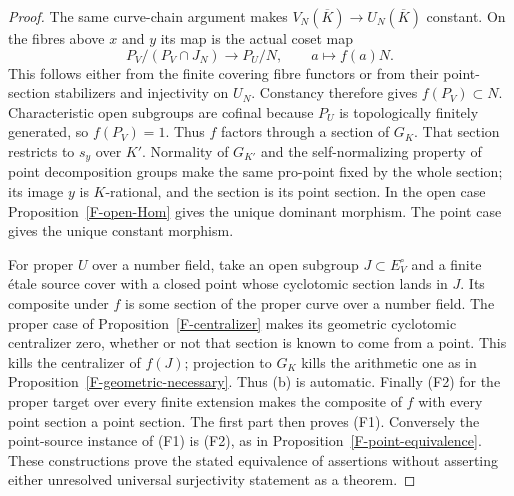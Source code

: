 \documentclass[11pt,oneside]{article}
\begin{document}
\begin{proof}
The same curve-chain argument makes
$V_N(\overline K)\to U_N(\overline K)$ constant. On the
fibres above $x$ and $y$ its map is the actual coset map
\[
 P_V/(P_V\cap J_N)\longrightarrow P_U/N,
 \qquad a\longmapsto f(a)N.
\]
This follows either from the finite covering fibre functors or
from their point-section stabilizers and injectivity on $U_N$.
Constancy therefore gives $f(P_V)\subset N$. Characteristic
open subgroups are cofinal because $P_U$ is topologically
finitely generated, so $f(P_V)=1$. Thus $f$ factors through a
section of $G_K$. That section restricts to $s_y$ over $K'$.
Normality of $G_{K'}$ and the self-normalizing property of
point decomposition groups make the same pro-point fixed by the
whole section; its image $y$
is $K$-rational, and the section is its point section. In the
open case Proposition~\ref{F-open-Hom} gives the unique dominant
morphism. The point case gives the unique constant morphism.

For proper $U$ over a number field, take an open subgroup
$J\subset E_V^{\circ}$
and a finite \'etale source cover with a closed point whose
cyclotomic section lands in $J$. Its composite under $f$ is
some section of the proper curve over a number field. The
proper case of Proposition~\ref{F-centralizer} makes its
geometric cyclotomic centralizer zero, whether or not that
section is known to come from a point. This kills the
centralizer of $f(J)$; projection to $G_K$ kills the arithmetic
one as in Proposition~\ref{F-geometric-necessary}. Thus (b)
is automatic. Finally (F2) for the proper target over every
finite extension makes the composite of $f$ with every point
section a point section. The first part then proves (F1).
Conversely the point-source instance of (F1) is (F2), as in
Proposition~\ref{F-point-equivalence}. These constructions
prove the stated equivalence of assertions without asserting
either unresolved universal surjectivity statement as a theorem.
\end{proof}
\end{document}
